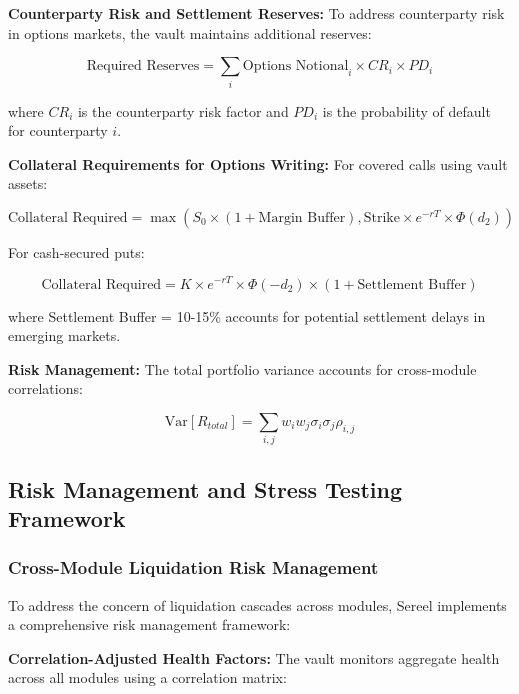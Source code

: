 \documentclass[12pt]{article}
\begin{document}
\textbf{Counterparty Risk and Settlement Reserves:}
To address counterparty risk in options markets, the vault maintains additional reserves:

\begin{equation}
\text{Required Reserves} = \sum_i \text{Options Notional}_i \times CR_i \times PD_i
\end{equation}

where $CR_i$ is the counterparty risk factor and $PD_i$ is the probability of default for counterparty $i$.

\textbf{Collateral Requirements for Options Writing:}
For covered calls using vault assets:

\begin{equation}
\text{Collateral Required} = \max(S_0 \times (1 + \text{Margin Buffer}), \text{Strike} \times e^{-rT} \times \Phi(d_2))
\end{equation}

For cash-secured puts:

\begin{equation}
\text{Collateral Required} = K \times e^{-rT} \times \Phi(-d_2) \times (1 + \text{Settlement Buffer})
\end{equation}

where Settlement Buffer = 10-15\% accounts for potential settlement delays in emerging markets.

\textbf{Risk Management:}
The total portfolio variance accounts for cross-module correlations:

\begin{equation}
\text{Var}[R_{total}] = \sum_{i,j} w_i w_j \sigma_i \sigma_j \rho_{i,j}
\end{equation}

\subsection{Risk Management and Stress Testing Framework}

\subsubsection{Cross-Module Liquidation Risk Management}

To address the concern of liquidation cascades across modules, Sereel implements a comprehensive risk management framework:

\textbf{Correlation-Adjusted Health Factors:}
The vault monitors aggregate health across all modules using a correlation matrix:
\end{document}
